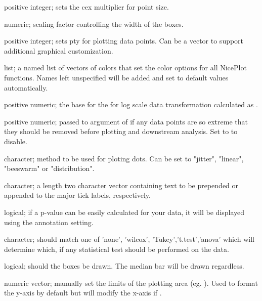 \documentclass[a4paper]{book}
\begin{document}
\begin{Arguments}
\begin{ldescription}
\item[\code{pointSize}] positive integer; sets the cex multiplier for point size.

\item[\code{width}] numeric; scaling factor controlling the width of the boxes.

\item[\code{pointShape}] positive integer; sets pty for plotting data points. Can be a vector to support additional graphical customization.

\item[\code{plotColors}] list; a named list of vectors of colors that set the color options for all NicePlot functions. Names left unspecified will be added and set to default values automatically.

\item[\code{logScale}] positive numeric; the base for the for log scale data transformation calculated as .

\item[\code{trim}] positive numeric; passed to  argument of  if any data points are so extreme that they should be removed before plotting and downstream analysis. Set to  to disable.

\item[\code{pointMethod}] character; method to be used for ploting dots. Can be set to "jitter", "linear", "beeswarm" or "distribution".

\item[\code{axisText}] character; a length two character vector containing text to be prepended or appended to the major tick labels, respectively.

\item[\code{showCalc}] logical; if a p-value can be easily calculated for your data, it will be displayed using the  annotation setting.

\item[\code{calcType}] character; should match one of 'none', 'wilcox', 'Tukey','t.test','anova' which will determine which, if any statistical test should be performed on the data.

\item[\code{drawBox}] logical; should the boxes be drawn. The median bar will be drawn regardless.

\item[\code{yLim}] numeric vector; manually set the limits of the plotting area (eg. ). Used to format the y-axis by default but will modify the x-axis if .


\end{ldescription}
\end{Arguments}
\end{document}
